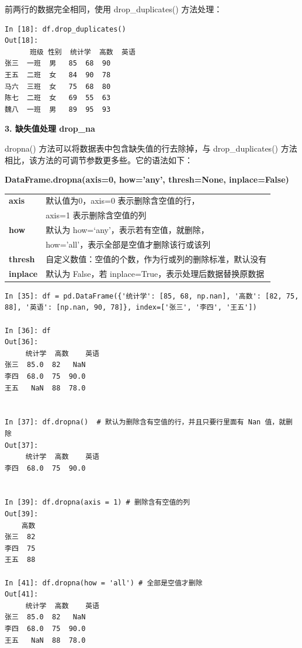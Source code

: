 前两行的数据完全相同，使用 drop\_duplicates() 方法处理：

\begin{lstlisting}[Language=Python]
In [18]: df.drop_duplicates()
Out[18]:
      班级 性别  统计学  高数  英语
张三  一班  男   85  68  90
王五  二班  女   84  90  78
马六  三班  女   75  68  80
陈七  二班  女   69  55  63
魏八  一班  男   89  95  93
\end{lstlisting}

\vspace{3pt}
\noindent\textbf{3. 缺失值处理 drop\_na}
\vspace{3pt}

dropna() 方法可以将数据表中包含缺失值的行去除掉，与 drop\_duplicates() 方法相比，该方法的可调节参数更多些。它的语法如下：


\begin{center}
\begin{tcolorbox}[title = dropna 的语法]
\textbf{DataFrame.dropna(axis=0, how='any', thresh=None, inplace=False)}
\tcblower
\vspace{10pt}

\begin{tcboutputlisting}
\begin{tabular}{>{\bfseries}ll}
  axis &默认值为0，axis=0 表示删除含空值的行，\\
  &axis=1 表示删除含空值的列\\
how & 默认为 how=`any'，表示若有空值，就删除，\\
&how='all'，表示全部是空值才删除该行或该列\\
 thresh & 自定义数值：空值的个数，作为行或列的删除标准，默认没有\\
inplace&  默认为 False，若 inplace=True，表示处理后数据替换原数据\\
\end{tabular}
\end{tcboutputlisting}
\tcbuselistingtext
\end{tcolorbox}
\end{center}


\begin{lstlisting}[Language=Python]
In [35]: df = pd.DataFrame({'统计学': [85, 68, np.nan], '高数': [82, 75, 88], '英语': [np.nan, 90, 78]}, index=['张三', '李四', '王五'])

In [36]: df
Out[36]:
     统计学  高数    英语
张三  85.0  82   NaN
李四  68.0  75  90.0
王五   NaN  88  78.0


In [37]: df.dropna()  # 默认为删除含有空值的行，并且只要行里面有 Nan 值，就删除
Out[37]:
     统计学  高数    英语
李四  68.0  75  90.0


In [39]: df.dropna(axis = 1) # 删除含有空值的列
Out[39]:
    高数
张三  82
李四  75
王五  88

In [41]: df.dropna(how = 'all') # 全部是空值才删除
Out[41]:
     统计学  高数    英语
张三  85.0  82   NaN
李四  68.0  75  90.0
王五   NaN  88  78.0
\end{lstlisting}

